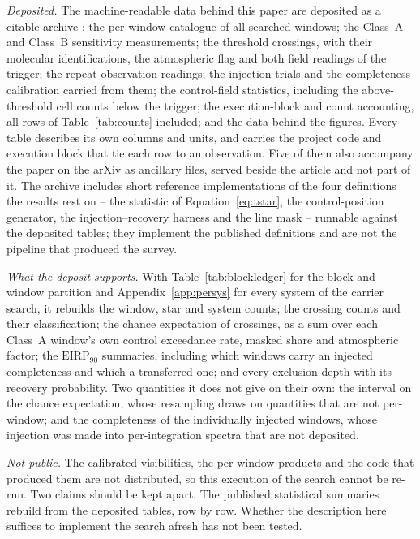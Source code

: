 \emph{Deposited.} The machine-readable data behind this paper are deposited
as a citable archive \citep{SIdeposit}: the per-window catalogue of all
\NWindows{} searched windows; the Class~A and Class~B sensitivity
measurements; the \EvNCrossRaw{} threshold crossings, with their molecular
identifications, the atmospheric flag and both field readings of the trigger;
the repeat-observation readings; the injection trials and the completeness
calibration carried from them; the control-field statistics, including the
above-threshold cell counts below the trigger; the execution-block and count
accounting, all \MtCountRows{} rows of Table~\ref{tab:counts} included; and
the data behind the figures. Every table describes its own columns and units,
and carries the project code and execution block that tie each row to an
observation. Five of them also accompany the paper on the arXiv as ancillary
files, served beside the article and not part of it. The archive includes
short reference implementations of the four definitions the results rest on
-- the statistic of Equation~\ref{eq:tstar}, the control-position generator,
the injection--recovery harness and the line mask -- runnable against the
deposited tables; they implement the published definitions and are not the
pipeline that produced the survey.

\emph{What the deposit supports.} With Table~\ref{tab:blockledger} for the
block and window partition and Appendix~\ref{app:persys} for every system of
the carrier search, it rebuilds the window, star and system counts; the
crossing counts and their classification; the chance expectation of \CeExp{}
crossings, as a sum over each Class~A window's own control exceedance rate,
masked share and atmospheric factor; the $\mathrm{EIRP}_{90}$ summaries,
including which windows carry an injected completeness and which a
transferred one; and every exclusion depth with its recovery probability. Two
quantities it does not give on their own: the interval on the chance
expectation, whose resampling draws on quantities that are not per-window;
and the completeness of the individually injected windows, whose injection
was made into per-integration spectra that are not deposited.

\emph{Not public.} The calibrated visibilities, the per-window products and
the code that produced them are not distributed, so this execution of the
search cannot be re-run. Two claims should be kept apart. The published
statistical summaries rebuild from the deposited tables, row by row. Whether
the description here suffices to implement the search afresh has not been
tested.
